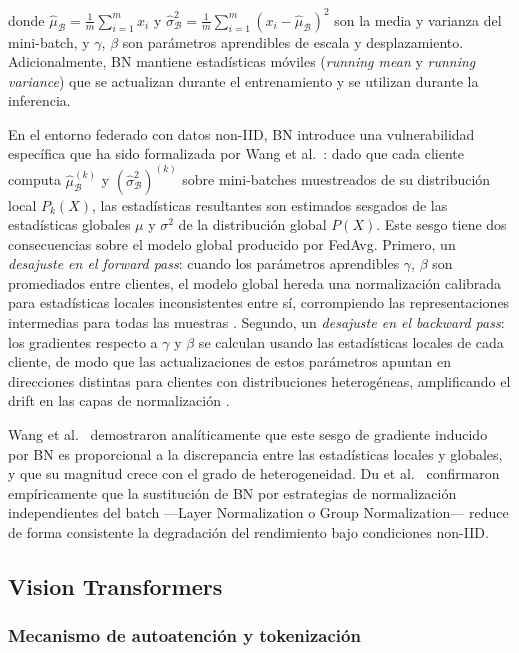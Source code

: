donde $\hat{\mu}_{\mathcal{B}} = \frac{1}{m}\sum_{i=1}^m x_i$ y
$\hat{\sigma}^2_{\mathcal{B}} = \frac{1}{m}\sum_{i=1}^m (x_i - \hat{\mu}_{\mathcal{B}})^2$
son la media y varianza del mini-batch, y $\gamma$, $\beta$ son parámetros aprendibles de
escala y desplazamiento. Adicionalmente, BN mantiene estadísticas móviles (\textit{running
mean} y \textit{running variance}) que se actualizan durante el entrenamiento y se utilizan
durante la inferencia.

En el entorno federado con datos non-IID, BN introduce una vulnerabilidad específica que ha
sido formalizada por Wang et al.\ \cite{wang2023batch}: dado que cada cliente computa
$\hat{\mu}_{\mathcal{B}}^{(k)}$ y $\left(\hat{\sigma}^{2}_{\mathcal{B}}\right)^{(k)}$ sobre mini-batches
muestreados de su distribución local $P_k(X)$, las estadísticas resultantes son estimados
sesgados de las estadísticas globales $\mu$ y $\sigma^2$ de la distribución global $P(X)$.
Este sesgo tiene dos consecuencias sobre el modelo global producido por FedAvg. Primero, un
\textit{desajuste en el forward pass}: cuando los parámetros aprendibles $\gamma$, $\beta$
son promediados entre clientes, el modelo global hereda una normalización calibrada para
estadísticas locales inconsistentes entre sí, corrompiendo las representaciones intermedias
para todas las muestras \cite{wang2023batch}. Segundo, un \textit{desajuste en el backward
pass}: los gradientes respecto a $\gamma$ y $\beta$ se calculan usando las estadísticas locales
de cada cliente, de modo que las actualizaciones de estos parámetros apuntan en direcciones
distintas para clientes con distribuciones heterogéneas, amplificando el drift en las capas
de normalización \cite{du2022rethinking}.

Wang et al.\ \cite{wang2023batch} demostraron analíticamente que este sesgo de gradiente
inducido por BN es proporcional a la discrepancia entre las estadísticas locales y globales,
y que su magnitud crece con el grado de heterogeneidad. Du et al.\ \cite{du2022rethinking}
confirmaron empíricamente que la sustitución de BN por estrategias de normalización
independientes del batch —Layer Normalization o Group Normalization— reduce de forma
consistente la degradación del rendimiento bajo condiciones non-IID.

\subsection{Vision Transformers}

\subsubsection{Mecanismo de autoatención y tokenización}

